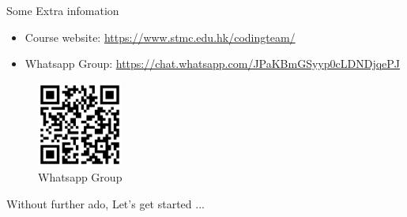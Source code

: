 \documentclass[10pt,xcolor={table,dvipsnames},t]{beamer}
\begin{document}
\begin{frame}{Some Extra infomation}
    \begin{itemize}
      \item Course website: \href{https://www.stmc.edu.hk/codingteam/}{https://www.stmc.edu.hk/codingteam/}
      \item Whatsapp Group: \href{https://chat.whatsapp.com/JPaKBmGSyyp0cLDNDjqePJ}{https://chat.whatsapp.com/JPaKBmGSyyp0cLDNDjqePJ}
    \end{itemize}
    \begin{figure}[h!]
      \centering
      \includegraphics[width=0.25\textwidth]{WhatsappGrpURL.png}
      \caption{Whatsapp Group}
    \end{figure}
\end{frame}

\begin{frame}{Without further ado, Let's get started ...}
  
\end{frame}
\end{document}
